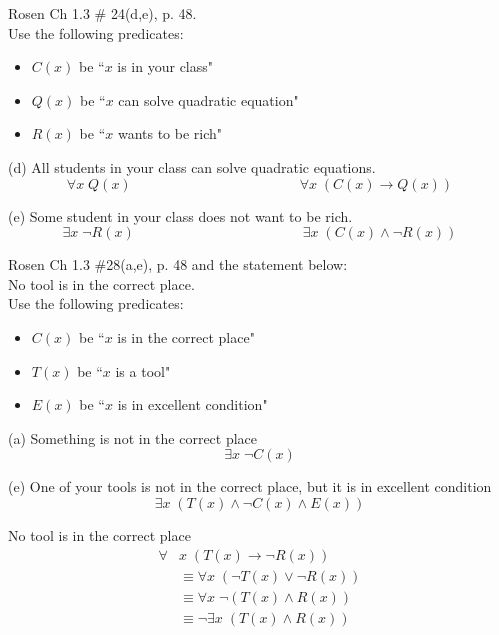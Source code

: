 \documentclass[12pt]{exam}
\newenvironment{my_item}{
\begin{itemize}
    \setlength{\itemsep}{1pt}
    \setlength{\parskip}{0pt}
    \setlength{\parsep}{0pt}
}{\end{itemize}}
\begin{document}
\begin{questions}
\printanswers

\question Rosen Ch 1.3 \# 24(d,e), p. 48. \\
Use the following predicates:
\begin{itemize}
    \item $C(x)$ be ``$x$ is in your class"
    \item $Q(x)$ be ``$x$ can solve quadratic equation"
    \item $R(x)$ be ``$x$ wants to be rich"
\end{itemize}
    \begin{solution}
    \begin{my_item}
        \item[(d)] All students in your class can solve quadratic equations.
        $$ \forall x\; Q(x) \hspace{2in} \forall x\; (C(x) \rightarrow Q(x))$$
        \item[(e)] Some student in your class does not want to be rich.
        $$ \exists x\; \neg R(x) \hspace{2in} \exists x\; (C(x) \wedge \neg R(x))$$
    \end{my_item}
    \end{solution}

\question Rosen Ch 1.3 \#28(a,e), p. 48 and the statement below:\\
No tool is in the correct place. \\
Use the following predicates:
\begin{itemize}
    \item $C(x)$ be ``$x$ is in the correct place"
    \item $T(x)$ be ``$x$ is a tool"
    \item $E(x)$ be ``$x$ is in excellent condition"
\end{itemize}
    \begin{solution}
    \begin{my_item}
        \item[(a)] Something is not in the correct place
        $$ \exists x\; \neg C(x) $$
        \item[(e)] One of your tools is not in the correct place, but it is in excellent condition
        $$ \exists x\; (T(x) \wedge \neg C(x) \wedge E(x)) $$
        \item No tool is in the correct place
        \begin{align*}
            \forall &x\; (T(x) \rightarrow \neg R(x)) \\
            &\equiv \forall x\; (\neg T(x) \vee \neg R(x)) \\
            &\equiv \forall x\; \neg(T(x) \wedge R(x)) \\
            &\equiv \neg \exists x\; (T(x) \wedge R(x))
        \end{align*}
    \end{my_item}
    \end{solution}



\end{questions}
\end{document}
